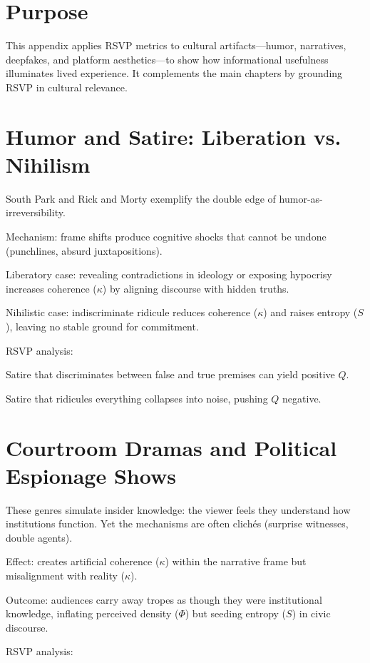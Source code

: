 \documentclass[openany]{book}
\begin{document}
\section{Purpose}

This appendix applies RSVP metrics to cultural artifacts—humor, narratives, deepfakes, and platform aesthetics—to show how informational usefulness illuminates lived experience. It complements the main chapters by grounding RSVP in cultural relevance.

\section{Humor and Satire: Liberation vs. Nihilism}

South Park and Rick and Morty exemplify the double edge of humor-as-irreversibility.

Mechanism: frame shifts produce cognitive shocks that cannot be undone (punchlines, absurd juxtapositions).

Liberatory case: revealing contradictions in ideology or exposing hypocrisy increases coherence (\( \kappa \)) by aligning discourse with hidden truths.

Nihilistic case: indiscriminate ridicule reduces coherence (\( \kappa \)) and raises entropy (\( S \)), leaving no stable ground for commitment.

RSVP analysis:

Satire that discriminates between false and true premises can yield positive \( Q \).

Satire that ridicules everything collapses into noise, pushing \( Q \) negative.

\section{Courtroom Dramas and Political Espionage Shows}

These genres simulate insider knowledge: the viewer feels they understand how institutions function. Yet the mechanisms are often clichés (surprise witnesses, double agents).

Effect: creates artificial coherence (\( \kappa \)) within the narrative frame but misalignment with reality (\( \kappa \)).

Outcome: audiences carry away tropes as though they were institutional knowledge, inflating perceived density (\( \Phi \)) but seeding entropy (\( S \)) in civic discourse.

RSVP analysis:
\end{document}
